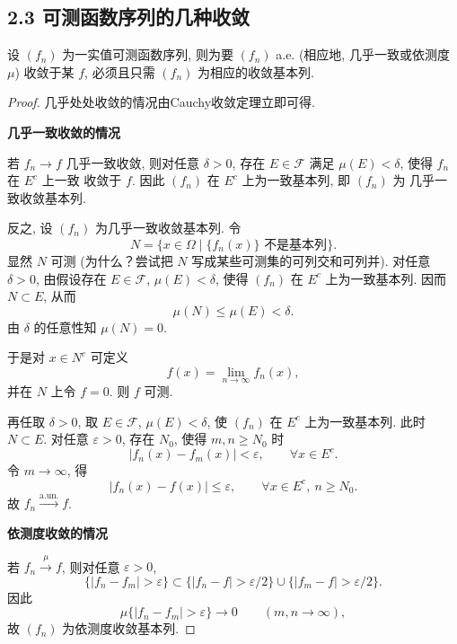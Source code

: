     \subsection{2.3 可测函数序列的几种收敛}
        \begin{1}
            设 $(f_n)$ 为一实值可测函数序列, 
            则为要 $(f_n)$ a.e. (相应地, 几乎一致或依测度 $\mu$) 收敛于某 $f$, 
            必须且只需 $(f_n)$ 为相应的收敛基本列. 
        \end{1}
        \begin{proof}
            几乎处处收敛的情况由Cauchy收敛定理立即可得.

            \textbf{几乎一致收敛的情况}

            若 $f_n\to f$ 几乎一致收敛, 则对任意 $\delta>0$, 存在
            $E\in\mathcal{F}$ 满足 $\mu(E)<\delta$, 使得 $f_n$ 在 $E^c$ 上一致
            收敛于 $f$. 因此 $(f_n)$ 在 $E^c$ 上为一致基本列, 即 $(f_n)$ 为
            几乎一致收敛基本列.

            反之, 设 $(f_n)$ 为几乎一致收敛基本列. 令
            \[
                N=\{x\in\Omega\mid \{f_n(x)\}\text{ 不是基本列}\}.
            \]
            显然 $N$ 可测 (为什么？尝试把 $N$ 写成某些可测集的可列交和可列并). 对任意 $\delta>0$, 由假设存在 $E\in\mathcal{F}$,
            $\mu(E)<\delta$, 使得 $(f_n)$ 在 $E^c$ 上为一致基本列. 因而
            $N\subset E$, 从而
            \[
                \mu(N)\leqslant\mu(E)<\delta.
            \]
            由 $\delta$ 的任意性知 $\mu(N)=0$.

            于是对 $x\in N^c$ 可定义
            \[
                f(x)=\lim_{n\to\infty}f_n(x),
            \]
            并在 $N$ 上令 $f=0$. 则 $f$ 可测.

            再任取 $\delta>0$, 取 $E\in\mathcal{F}$, $\mu(E)<\delta$, 使
            $(f_n)$ 在 $E^c$ 上为一致基本列. 此时 $N\subset E$. 对任意
            $\varepsilon>0$, 存在 $N_0$, 使得 $m,n\geqslant N_0$ 时
            \[
                |f_n(x)-f_m(x)|<\varepsilon,\qquad \forall x\in E^c.
            \]
            令 $m\to\infty$, 得
            \[
                |f_n(x)-f(x)|\leqslant\varepsilon,\qquad
                \forall x\in E^c,\ n\geqslant N_0.
            \]
            故 $f_n\stackrel{\text{a.un.}}{\longrightarrow}f$.

            \textbf{依测度收敛的情况}

            若 $f_n\stackrel{\mu}{\longrightarrow}f$, 则对任意
            $\varepsilon>0$,
            \[
                \{|f_n-f_m|>\varepsilon\}
                \subset
                \{|f_n-f|>\varepsilon/2\}
                \cup
                \{|f_m-f|>\varepsilon/2\}.
            \]
            因此
            \[
                \mu\{|f_n-f_m|>\varepsilon\}\to0
                \qquad (m,n\to\infty),
            \]
            故 $(f_n)$ 为依测度收敛基本列.


\end{proof}
